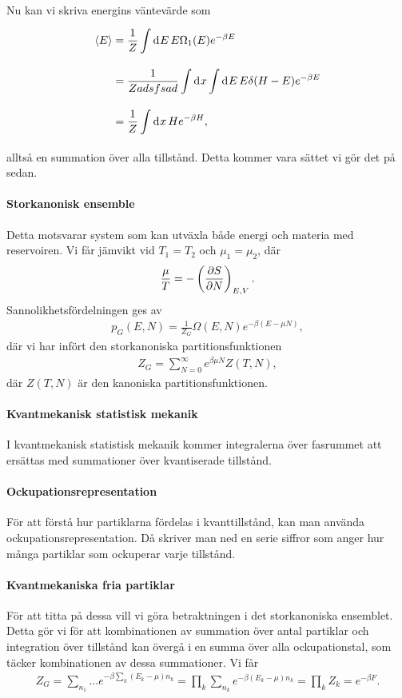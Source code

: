 Nu kan vi skriva energins väntevärde som
\begin{align*}
	\expval{E} &= \frac{1}{Z}\int\limits_{}^{}\dd[]{E}E\Omega_{1}(E)e^{-\beta E} \\
	           &= \frac{1}{Zadsfsad}\int\limits_{}^{}\dd[]{x}\int\limits_{}^{}\dd[]{E}E\delta(H - E)e^{-\beta E} \\
	           &= \frac{1}{Z}\int\limits_{}^{}\dd[]{x}He^{-\beta H},
\end{align*}
alltså en summation över alla tillstånd. Detta kommer vara sättet vi gör det på sedan.

\paragraph{Storkanonisk ensemble}
Detta motsvarar system som kan utväxla både energi och materia med reservoiren. Vi får jämvikt vid $T_{1} = T_{2}$ och $\mu_{1} = \mu_{2}$, där
\begin{align*}
	\frac{\mu}{T} = -\left(\pdv{S}{N}\right)_{E, V}.
\end{align*}
Sannolikhetsfördelningen ges av
\begin{align*}
	p_{G}(E, N) = \frac{1}{Z_{G}}\Omega(E, N)e^{-\beta(E - \mu N)},
\end{align*}
där vi har infört den storkanoniska partitionsfunktionen
\begin{align*}
	Z_{G} = \sum\limits_{N = 0}^{\infty}e^{\beta\mu N}Z(T, N),
\end{align*}
där $Z(T, N)$ är den kanoniska partitionsfunktionen.

\paragraph{Kvantmekanisk statistisk mekanik}
I kvantmekanisk statistisk mekanik kommer integralerna över fasrummet att ersättas med summationer över kvantiserade tillstånd.

\paragraph{Ockupationsrepresentation}
För att förstå hur partiklarna fördelas i kvanttillstånd, kan man använda ockupationsrepresentation. Då skriver man ned en serie siffror som anger hur många partiklar som ockuperar varje tillstånd.

\paragraph{Kvantmekaniska fria partiklar}
För att titta på dessa vill vi göra betraktningen i det storkanoniska ensemblet. Detta gör vi för att kombinationen av summation över antal partiklar och integration över tillstånd kan övergå i en summa över alla ockupationstal, som täcker kombinationen av dessa summationer. Vi får
\begin{align*}
	Z_{G} = \sum\limits_{n_1}\dots e^{-\beta\sum\limits_{k}(E_{k} - \mu)n_{k}} = \prod\limits_{k}\sum\limits_{n_{k}}e^{-\beta(E_{k} - \mu)n_{k}} = \prod\limits_{k}Z_{k} = e^{-\beta F}.
\end{align*}

